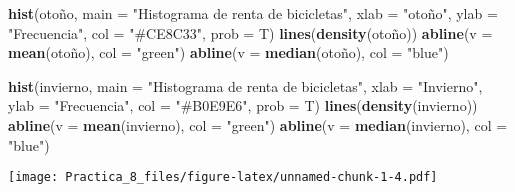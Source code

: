 \documentclass[
]{article}
\newenvironment{Shaded}{\begin{snugshade}}{\end{snugshade}}
\newcommand{\DataTypeTok}[1]{\textcolor[rgb]{0.13,0.29,0.53}{#1}}
\newcommand{\KeywordTok}[1]{\textcolor[rgb]{0.13,0.29,0.53}{\textbf{#1}}}
\newcommand{\NormalTok}[1]{#1}
\newcommand{\OperatorTok}[1]{\textcolor[rgb]{0.81,0.36,0.00}{\textbf{#1}}}
\newcommand{\StringTok}[1]{\textcolor[rgb]{0.31,0.60,0.02}{#1}}
\begin{document}
\begin{Shaded}
\begin{Highlighting}[]
\KeywordTok{hist}\NormalTok{(otoño, }\DataTypeTok{main =} \StringTok{"Histograma de renta de bicicletas"}\NormalTok{, }
     \DataTypeTok{xlab =} \StringTok{"otoño"}\NormalTok{, }
     \DataTypeTok{ylab =} \StringTok{"Frecuencia"}\NormalTok{,}
     \DataTypeTok{col =} \StringTok{"#CE8C33"}\NormalTok{, }\DataTypeTok{prob =}\NormalTok{ T)}
\KeywordTok{lines}\NormalTok{(}\KeywordTok{density}\NormalTok{(otoño))}
\KeywordTok{abline}\NormalTok{(}\DataTypeTok{v =} \KeywordTok{mean}\NormalTok{(otoño), }\DataTypeTok{col =} \StringTok{"green"}\NormalTok{)}
\KeywordTok{abline}\NormalTok{(}\DataTypeTok{v =} \KeywordTok{median}\NormalTok{(otoño), }\DataTypeTok{col =} \StringTok{"blue"}\NormalTok{)}

\KeywordTok{hist}\NormalTok{(invierno, }\DataTypeTok{main =} \StringTok{"Histograma de renta de bicicletas"}\NormalTok{, }
     \DataTypeTok{xlab =} \StringTok{"Invierno"}\NormalTok{, }
     \DataTypeTok{ylab =} \StringTok{"Frecuencia"}\NormalTok{, }
     \DataTypeTok{col =} \StringTok{"#B0E9E6"}\NormalTok{, }\DataTypeTok{prob =}\NormalTok{ T)}
\KeywordTok{lines}\NormalTok{(}\KeywordTok{density}\NormalTok{(invierno))}
\KeywordTok{abline}\NormalTok{(}\DataTypeTok{v =} \KeywordTok{mean}\NormalTok{(invierno), }\DataTypeTok{col =} \StringTok{"green"}\NormalTok{)}
\KeywordTok{abline}\NormalTok{(}\DataTypeTok{v =} \KeywordTok{median}\NormalTok{(invierno), }\DataTypeTok{col =} \StringTok{"blue"}\NormalTok{)}
\end{Highlighting}
\end{Shaded}

\texttt{[image: Practica\_8\_files/figure-latex/unnamed-chunk-1-4.pdf]}

\begin{Shaded}
\end{Shaded}
\end{document}
